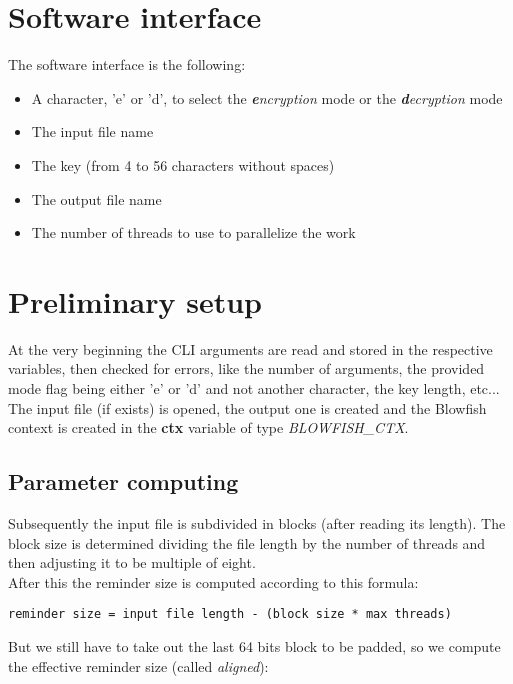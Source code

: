\section{Software interface}
The software interface is the following:
\begin{itemize}
\item A character, 'e' or 'd', to select the \textit{\textbf{e}ncryption} mode or the \textit{\textbf{d}ecryption} mode
\item The input file name
\item The key (from 4 to 56 characters without spaces)
\item The output file name
\item The number of threads to use to parallelize the work
\end{itemize}


\section{Preliminary setup}
At the very beginning the CLI arguments are read and stored in the respective variables, then checked for errors, like the number of arguments, the  provided mode flag being either 'e' or 'd' and not another character, the key length, etc...\\
The input file (if exists) is opened, the output one is created and the Blowfish context is created in the \textbf{ctx} variable of type \emph{BLOWFISH\_CTX}.\\

\subsection{Parameter computing}
Subsequently the input file is subdivided in blocks (after reading its length). The block size is determined dividing the file length by the number of threads and then adjusting it to be multiple of eight.\\
After this the reminder size is computed according to this formula:

\begin{scripting}
\begin{verbatim}
reminder size = input file length - (block size * max threads)
\end{verbatim}
\end{scripting}

But we still have to take out the last 64 bits block to be padded, so we compute the effective reminder size (called \emph{aligned}):

